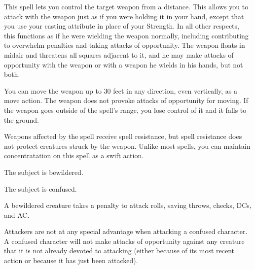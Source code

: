 \spellrng{\rngclose}
\begin{spelleffect}
This spell lets you control the target weapon from a distance. This allows you to attack with the weapon just as if you were holding it in your hand, except that you use your casting attribute in place of your Strength. In all other respects, this functions as if he were wielding the weapon normally, including contributing to overwhelm penalties and taking attacks of opportunity. The weapon floats in midair and threatens all squares adjacent to it, and he may make attacks of opportunity with the weapon or with a weapon he wields in his hands, but not both.

You can move the weapon up to 30 feet in any direction, even vertically, as a move action. The weapon does not provoke attacks of opportunity for moving. If the weapon goes outside of the spell's range, you lose control of it and it falls to the ground.
\end{spelleffect}
\begin{spellnotes}
    Weapons affected by the spell receive spell resistance, but spell resistance does not protect creatures struck by the weapon. Unlike most spells, you can maintain concentratation on this spell as a swift action.
\end{spellnotes}

\begin{spellhealthy}
The subject is bewildered.
\end{spellhealthy}
\begin{spellblood}
The subject is confused. \confusionexplanation
\end{spellblood}
\begin{spellnotes}
A bewildered creature takes a  penalty to attack rolls, saving throws, checks, DCs, and AC.
\par Attackers are not at any special advantage when attacking a confused character. A confused character will not make attacks of opportunity against any creature that it is not already devoted to attacking (either because of its most recent action or because it has just been attacked).
\end{spellnotes}

